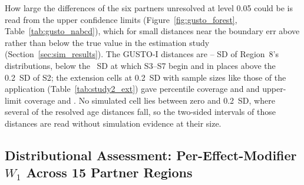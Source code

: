 \documentclass[AMA,Times1COL]{WileyNJDv5}
\begin{document}
How large the differences of the six partners unresolved at level 0.05 could be is read from the upper confidence limits (Figure~\ref{fig:gusto_forest}, Table~\ref{tab:gusto_nabcd}), which for small distances near the boundary err above rather than below the true value in the estimation study (Section~\ref{sec:sim_results}). The GUSTO-I distances are -- SD of Region~8's distributions, below the ~SD at which S3--S7 begin and in places above the 0.2~SD of S2; the extension cells at 0.2~SD with sample sizes like those of the application (Table~\ref{tab:study2_ext}) gave percentile coverage  and  and upper-limit coverage  and . No simulated cell lies between zero and 0.2~SD, where several of the resolved age distances fall, so the two-sided intervals of those distances are read without simulation evidence at their size.

\subsection{Distributional Assessment: Per-Effect-Modifier $W_1$ Across 15 Partner Regions}\label{sec:app_nabcd}
\end{document}
